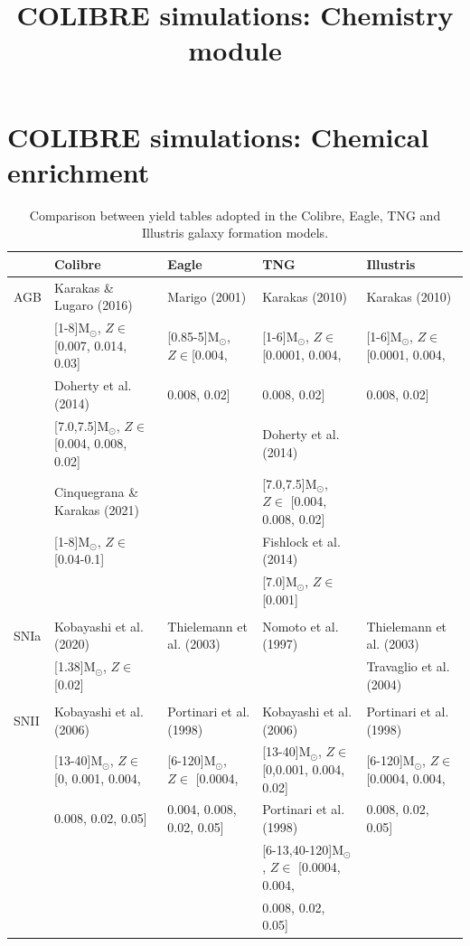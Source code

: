 \documentclass[11pt,a4paper,fleqn,usenatbib,twocolumn]{mnras}
\title[COLIBRE simulations: Chemistry module]{COLIBRE simulations: Chemistry module}
\author[Camila A. Correa]{}
\begin{document}


\section{COLIBRE simulations: Chemical enrichment}



\begin{table}
\begin{center}
\begin{tabular}{l|l|l|l|l}
\hline
& Colibre & Eagle & TNG & Illustris\\
\hline
AGB & Karakas \& Lugaro (2016) & Marigo (2001) & Karakas (2010) & Karakas (2010) \\
& [1-8]M$_{\odot}$, $Z{\in}$[0.007, 0.014, 0.03] & [0.85-5]M$_{\odot}$, $Z{\in}$[0.004, & [1-6]M$_{\odot}$, $Z{\in}$[0.0001, 0.004, & [1-6]M$_{\odot}$, $Z{\in}$[0.0001, 0.004, \\
& Doherty et al. (2014) & 0.008, 0.02] & 0.008, 0.02] & 0.008, 0.02]\\
& [7.0,7.5]M$_{\odot}$, $Z{\in}$ [0.004, 0.008, 0.02]  & & Doherty et al. (2014)  &\\
& Cinquegrana \& Karakas (2021) & & [7.0,7.5]M$_{\odot}$, $Z{\in}$ [0.004, 0.008, 0.02]&\\
& [1-8]M$_{\odot}$, $Z{\in}$ [0.04-0.1] & & Fishlock et al. (2014) & \\
& & & [7.0]M$_{\odot}$, $Z{\in}$ [0.001] &\\\\
SNIa & Kobayashi et al. (2020) & Thielemann et al. (2003) & Nomoto et al. (1997) & Thielemann et al. (2003)\\
& [1.38]M$_{\odot}$, $Z{\in}$ [0.02] & & & Travaglio et al. (2004)\\\\
SNII & Kobayashi et al. (2006) & Portinari et al. (1998) & Kobayashi et al. (2006) & Portinari et al. (1998) \\
& [13-40]M$_{\odot}$, $Z{\in}$ [0, 0.001, 0.004, & [6-120]M$_{\odot}$, $Z{\in}$ [0.0004, & [13-40]M$_{\odot}$, $Z{\in}$ [0,0.001, 0.004, 0.02] & [6-120]M$_{\odot}$, $Z{\in}$ [0.0004, 0.004,\\
& 0.008, 0.02, 0.05] & 0.004, 0.008, 0.02, 0.05] & Portinari et al. (1998) & 0.008, 0.02, 0.05]  \\
& & & [6-13,40-120]M$_{\odot}$, $Z{\in}$ [0.0004, 0.004, \\
& & & 0.008, 0.02, 0.05]\\
\hline
\end{tabular}
\end{center}
\caption{Comparison between yield tables adopted in the Colibre, Eagle, TNG and Illustris galaxy formation models.}
\label{YieldTables}
\end{table}
\end{document}
